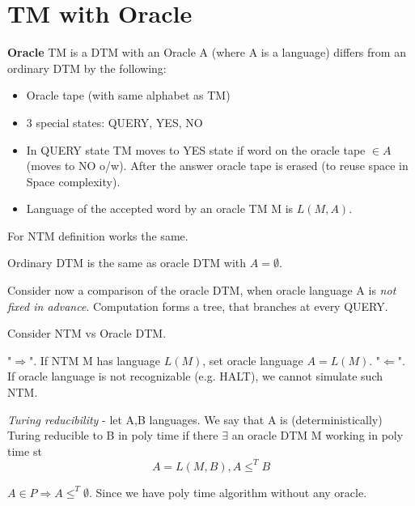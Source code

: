 \section{\texorpdfstring{TM with Oracle}{TM with Oracle}}
\vspace{5mm}
\large

\begin{definition}
	\textbf{Oracle} TM is a DTM with an Oracle A (where A is a language) differs from an ordinary DTM by the following:
	\begin{itemize}
		\item Oracle tape (with same alphabet as TM)
		\item 3 special states: QUERY, YES, NO
		\item In QUERY state TM moves to YES state if word on the oracle tape $\in A$ (moves to NO o/w).
			After the answer oracle tape is erased (to reuse space in Space complexity).
		\item Language of the accepted word by an oracle TM M is $L(M, A)$.
	\end{itemize}
\end{definition}

\begin{note}
	For NTM definition works the same.
\end{note}

\begin{note}
	Ordinary DTM is the same as oracle DTM with $A = \emptyset$.
\end{note}

Consider now a comparison of the oracle DTM, when oracle language A is \emph{not fixed in advance}.
Computation forms a tree, that branches at every QUERY.

\begin{observation}
	Consider NTM vs Oracle DTM.

	"$\Rightarrow$". If NTM M has language $L(M)$, set oracle language $A = L(M)$.
	"$\Leftarrow$". If oracle language is not recognizable (e.g. HALT), we cannot simulate such NTM.
\end{observation}

\begin{definition}
	\emph{Turing reducibility} - let A,B languages.
	We say that A is (deterministically) Turing reducible to B in poly time if there $\exists$ an oracle DTM M working in poly time st
	\[ A = L(M, B), A \leq^T B \]
\end{definition}

\begin{example}
	$A \in P \Rightarrow A \leq^T \emptyset$. Since we have poly time algorithm without any oracle.
\end{example}

